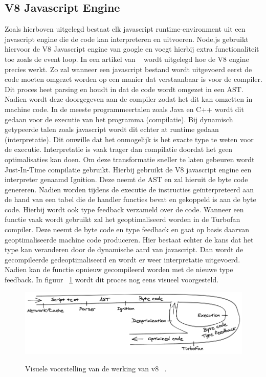 \subsection{V8 Javascript Engine}
Zoals hierboven uitgelegd bestaat elk javascript runtime-environment uit een javascript engine die de code kan interpreteren en uitvoeren.
Node.js gebruikt hiervoor de V8 Javascript engine van google en voegt hierbij extra functionaliteit toe zoals de event loop.
In een artikel van ~\textcite{Lyamkin2020} wordt uitgelegd hoe de V8 engine precies werkt. 
Zo zal wanneer een javascript bestand wordt uitgevoerd eerst de code moeten omgezet worden op een manier dat verstaanbaar is voor de compiler.
Dit proces heet parsing en houdt in dat de code wordt omgezet in een AST. 
Nadien wordt deze doorgegeven aan de compiler zodat het dit kan omzetten in machine code. 
In de meeste programmeertalen zoals Java en C++ wordt dit gedaan voor de executie van het programma (compilatie).
Bij dynamisch getypeerde talen zoals javascript wordt dit echter at runtime gedaan (interpretatie). 
Dit omwille dat het onmogelijk is het exacte type te weten voor de executie.
Interpretatie is vaak trager dan compilatie doordat het geen optimalisaties kan doen.
Om deze transformatie sneller te laten gebeuren wordt Just-In-Time compilatie gebruikt.
Hierbij gebruikt de V8 javascript engine een interpreter genaamd Ignition. Deze neemt de AST en zal hieruit de byte code genereren.
Nadien worden tijdens de executie de instructies geïnterpreteerd aan de hand van een tabel die de handler functies bevat en gekoppeld is aan de byte code.
Hierbij wordt ook type feedback verzameld over de code. 
Wanneer een functie vaak wordt gebruikt zal het geoptimaliseerd worden in de Turbofan compiler.
Deze neemt de byte code en type feedback en gaat op basis daarvan geoptimaliseerde machine code produceren.
Hier bestaat echter de kans dat het type kan veranderen door de dynamische aard van javascript. 
Dan wordt de gecompileerde gedeoptimaliseerd en wordt er weer interpretatie uitgevoerd.
Nadien kan de functie opnieuw gecompileerd worden met de nieuwe type feedback.
In figuur ~\ref{fig:v8} wordt dit proces nog eens visueel voorgesteld.
\begin{figure}[h]
    \centering
    \includegraphics[width=.9\textwidth]{graphics/v8.png}
    \caption{\label{fig:v8}}Visuele voorstelling van de werking van v8 ~\autocite{Lyamkin2020}.
\end{figure}

